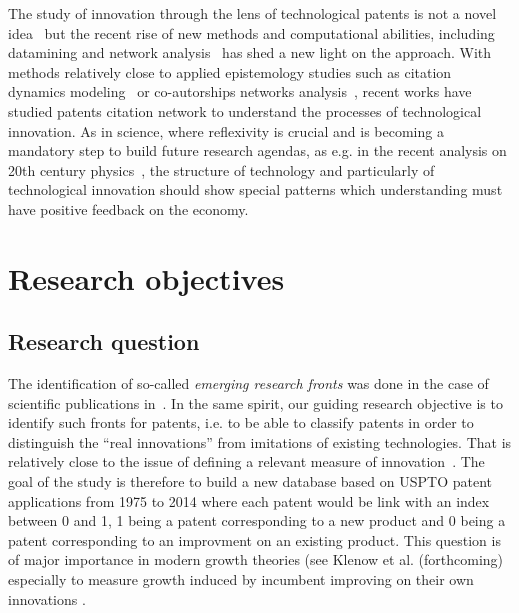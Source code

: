 

The study of innovation through the lens of technological patents is not a novel idea~\cite{basberg1987patents} but the recent rise of new methods and computational abilities, including datamining and network analysis~\cite{newman2010networks} has shed a new light on the approach. With methods relatively close to applied epistemology studies such as citation dynamics modeling~\cite{2013arXiv1310.8220N} or co-autorships networks analysis~\cite{2014arXiv1402.7268S}, recent works have studied patents citation network to understand the processes of technological innovation. As in science, where reflexivity is crucial and is becoming a mandatory step to build future research agendas, as e.g. in the recent analysis on 20th century physics~\cite{Sinatra:2015yu}, the structure of technology and particularly of technological innovation should show special patterns which understanding must have positive feedback on the economy.






\section{Research objectives}


\subsection{Research question}

The identification of so-called \emph{emerging research fronts} was done in the case of scientific publications in~\cite{shibata2008detecting}. In the same spirit, our guiding research objective is to identify such fronts for patents, i.e. to be able to classify patents in order to distinguish the ``real innovations'' from imitations of existing technologies. That is relatively close to the issue of defining a relevant measure of innovation~\cite{archibugi1988search}. The goal of the study is therefore to build a new database based on USPTO patent applications from 1975 to 2014 where each patent would be link with an index between 0 and 1, 1 being a patent corresponding to a new product and 0 being a patent corresponding to an improvment on an existing product. This question is of major importance in modern growth theories (see Klenow et al. (forthcoming) especially to measure growth induced by incumbent improving on their own innovations \cite{KletteKortum2002}.




